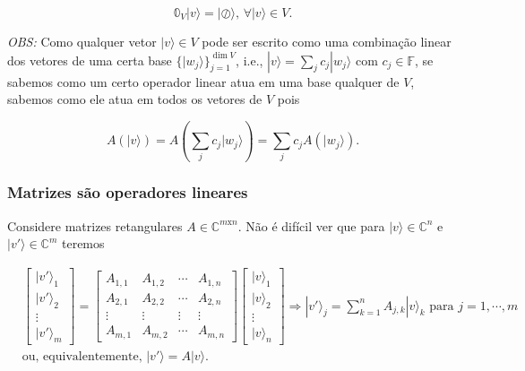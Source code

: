 \documentclass[11pt]{article}
\begin{document}
\begin{equation}
\mathbb{0}_{V}|v\rangle=|\oslash\rangle\text{, }\forall |v\rangle\in V.
\end{equation}

\emph{OBS:} Como qualquer vetor \(|v\rangle\in V\) pode ser escrito como
uma combinação linear dos vetores de uma certa base
\(\{|w_{j}\rangle\}_{j=1}^{\dim V}\), i.e.,
\(|v\rangle=\sum_{j}c_{j}|w_{j}\rangle\) com \(c_{j}\in\mathbb{F}\), se
sabemos como um certo operador linear atua em uma base qualquer de
\(V\), sabemos como ele atua em todos os vetores de \(V\) pois

\begin{equation}
A(|v\rangle) = A(\sum_{j}c_{j}|w_{j}\rangle)=\sum_{j}c_{j}A(|w_{j}\rangle). 
\end{equation}

    \subsubsection{Matrizes são operadores
lineares}\label{matrizes-suxe3o-operadores-lineares}

Considere matrizes retangulares \(A\in\mathbb{C}^{m\text{x}n}\). Não é
difícil ver que para \(|v\rangle\in\mathbb{C}^{n}\) e
\(|v'\rangle\in\mathbb{C}^{m}\) teremos

\begin{align}
& \begin{bmatrix} |v'\rangle_{1} \\ |v'\rangle_{2} \\ \vdots \\ |v'\rangle_{m} \end{bmatrix} = \begin{bmatrix} A_{1,1} & A_{1,2} & \cdots & A_{1,n} \\ A_{2,1} & A_{2,2} & \cdots & A_{2,n} \\ \vdots & \vdots & \vdots & \vdots \\ A_{m,1} & A_{m,2} & \cdots & A_{m,n} \end{bmatrix} \begin{bmatrix} |v\rangle_{1} \\ |v\rangle_{2} \\ \vdots \\ |v\rangle_{n} \end{bmatrix} \Rightarrow |v'\rangle_{j} = \sum_{k=1}^{n}A_{j,k}|v\rangle_{k}\text{ para }j=1,\cdots,m \\
& \text{ou, equivalentemente, } |v'\rangle=A|v\rangle.
\end{align}
\end{document}
